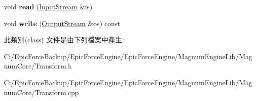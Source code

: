 \begin{DoxyCompactItemize}
\item 
void {\bfseries read} (\hyperlink{class_magnum_1_1_input_stream}{Input\+Stream} \&is)\hypertarget{class_magnum_1_1_transform_a441ea015ed03e3823780c60bdfd10136}{}\label{class_magnum_1_1_transform_a441ea015ed03e3823780c60bdfd10136}

\item 
void {\bfseries write} (\hyperlink{class_magnum_1_1_output_stream}{Output\+Stream} \&os) const \hypertarget{class_magnum_1_1_transform_ac6fac139249f7002f3a6e08230e63f0a}{}\label{class_magnum_1_1_transform_ac6fac139249f7002f3a6e08230e63f0a}

\end{DoxyCompactItemize}


此類別(class) 文件是由下列檔案中產生\+:\begin{DoxyCompactItemize}
\item 
C\+:/\+Epic\+Force\+Backup/\+Epic\+Force\+Engine/\+Epic\+Force\+Engine/\+Magnum\+Engine\+Lib/\+Magnum\+Core/Transform.\+h\item 
C\+:/\+Epic\+Force\+Backup/\+Epic\+Force\+Engine/\+Epic\+Force\+Engine/\+Magnum\+Engine\+Lib/\+Magnum\+Core/Transform.\+cpp\end{DoxyCompactItemize}
